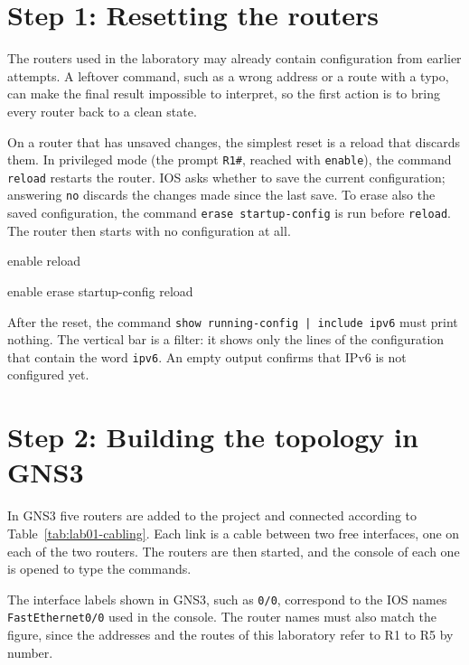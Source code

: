 \section{Step 1: Resetting the routers}

The routers used in the laboratory may already contain configuration from earlier attempts. A leftover command, such as a wrong address or a route with a typo, can make the final result impossible to interpret, so the first action is to bring every router back to a clean state.

On a router that has unsaved changes, the simplest reset is a reload that discards them. In privileged mode (the prompt \texttt{R1\#}, reached with \texttt{enable}), the command \texttt{reload} restarts the router. IOS asks whether to save the current configuration; answering \texttt{no} discards the changes made since the last save. To erase also the saved configuration, the command \texttt{erase startup-config} is run before \texttt{reload}. The router then starts with no configuration at all.

\begin{codeblock}
enable
reload
\end{codeblock}

\begin{codeblock}
enable
erase startup-config
reload
\end{codeblock}

After the reset, the command \texttt{show running-config | include ipv6} must print nothing. The vertical bar is a filter: it shows only the lines of the configuration that contain the word \texttt{ipv6}. An empty output confirms that IPv6 is not configured yet.

\section{Step 2: Building the topology in GNS3}

In GNS3 five routers are added to the project and connected according to Table~\ref{tab:lab01-cabling}. Each link is a cable between two free interfaces, one on each of the two routers. The routers are then started, and the console of each one is opened to type the commands.

The interface labels shown in GNS3, such as \texttt{0/0}, correspond to the IOS names \texttt{FastEthernet0/0} used in the console. The router names must also match the figure, since the addresses and the routes of this laboratory refer to R1 to R5 by number.

